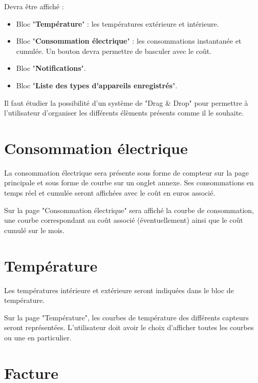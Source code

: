 \documentclass[10pt,a4paper]{article}
\begin{document}
Devra être affiché :
\begin{itemize}[label=$\bullet$]
\item Bloc "\textbf{Température}" : les températures extérieure et intérieure.
\item Bloc "\textbf{Consommation électrique}" : les consommations instantanée et cumulée. Un bouton devra permettre de basculer avec le coût.
\item Bloc "\textbf{Notifications}".
\item Bloc "\textbf{Liste des types d'appareils enregistrés}".
\end{itemize}

Il faut étudier la possibilité d'un système de "Drag \& Drop" pour permettre à l'utilisateur d'organiser les différents élèments présents comme il le souhaite.

\section{Consommation électrique}

La consommation électrique sera présente sous forme de compteur sur la page principale et sous forme de courbe sur un onglet annexe. Ses consommations en temps réel et cumulée seront affichées avec le coût en euros associé.

Sur la page "Consommation électrique" sera affiché la courbe de consommation, une courbe correspondant au coût associé (éventuellement) ainsi que le coût cumulé sur le mois.

\section{Température}

Les températures intérieure et extérieure seront indiquées dans le bloc de température.

Sur la page "Température", les courbes de température des différents capteurs seront représentées. L'utilisateur doit avoir le choix d'afficher toutes les courbes ou une en particulier.

\section{Facture}
\end{document}
